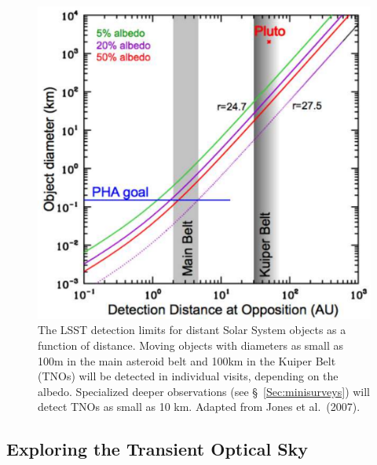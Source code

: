 \documentclass{emulateapj}
\begin{document}
\begin{figure}
\includegraphics[width=1.0\hsize,clip]{Af9.pdf}
\caption{The LSST detection limits for distant Solar System objects as
  a function of distance.
Moving objects with diameters as small as 100m in the main asteroid belt and 
100km in the Kuiper Belt (TNOs) will be detected in individual visits,
depending on the albedo. Specialized deeper observations  
(see \S~\ref{Sec:minisurveys}) will detect TNOs as small as 10 km. Adapted from 
Jones et al.~(2007).} 
\label{Fig:Af9}
\end{figure}


\subsection{ Exploring the Transient Optical Sky }
\end{document}
